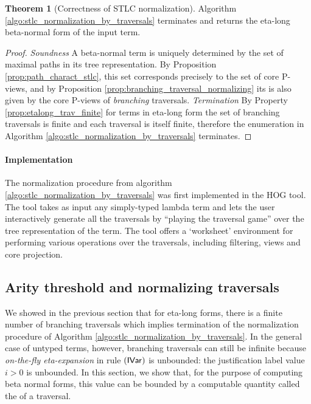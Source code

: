 \documentclass{article}
\theoremstyle{definition}
\newtheorem{theorem}{Theorem}[section]
\begin{document}
\begin{theorem}[Correctness of STLC normalization]
Algorithm \ref{algo:stlc_normalization_by_traversals} terminates and returns the eta-long beta-normal form of the input term.
\end{theorem}
\begin{proof}
\emph{Soundness} A beta-normal term is uniquely determined by the set of maximal paths in its tree representation. By Proposition \ref{prop:path_charact_stlc}, this set corresponds precisely to the set of core P-views,
and by Proposition \ref{prop:branching_traversal_normalizing} its is also given by the core P-views of \emph{branching} traversals.
\emph{Termination} By Property \ref{prop:etalong_trav_finite} for terms in eta-long form the set of branching traversals is finite and each traversal is itself finite, therefore the enumeration in Algorithm \ref{algo:stlc_normalization_by_traversals} terminates.
\end{proof}


\paragraph{Implementation} The normalization procedure from algorithm \ref{algo:stlc_normalization_by_traversals} was first implemented in the HOG tool\cite{BlumGalop2008, BlumPhd}. The tool takes as input any simply-typed lambda term and lets the user interactively generate all the traversals by ``playing the traversal game'' over the tree representation of the term. The tool offers a `worksheet' environment for performing various operations over the traversals, including filtering, views and core projection.

\subsection{Arity threshold and normalizing traversals}

We showed in the previous section that for eta-long forms, there is a finite number of branching traversals which implies termination of the normalization procedure of Algorithm \ref{algo:stlc_normalization_by_traversals}. In the general case of untyped terms, however, branching traversals can still be infinite because \emph{on-the-fly eta-expansion} in rule $\mathbf{({\sf IVar})}$ is unbounded: the justification label value $i>0$ is unbounded. In this section, we show that, for the purpose of computing beta normal forms, this value can be bounded by a computable quantity called the  of a traversal.
\end{document}
